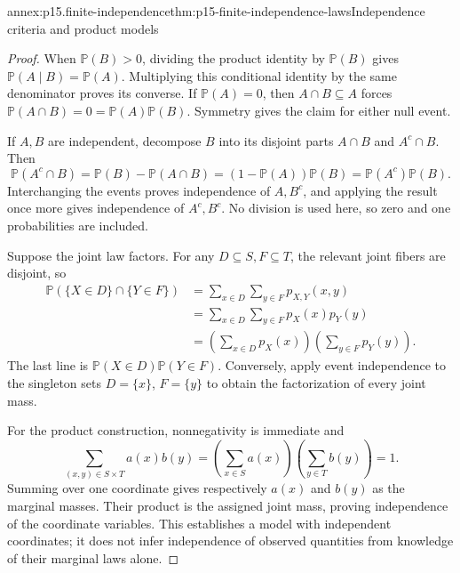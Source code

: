 \begin{annexitem}{annex:p15.finite-independence}{thm:p15-finite-independence-laws}{Independence criteria and product models}
\begin{proof}
When \(\mathbb P(B)>0\), dividing the product identity by
\(\mathbb P(B)\) gives \(\mathbb P(A\mid B)=\mathbb P(A)\).
Multiplying this conditional identity by the same denominator proves its
converse. If \(\mathbb P(A)=0\), then \(A\cap B\subseteq A\)
forces \(\mathbb P(A\cap B)=0=\mathbb P(A)\mathbb P(B)\).
Symmetry gives the claim for either null event.

If \(A,B\) are independent, decompose \(B\) into its disjoint parts
\(A\cap B\) and \(A^c\cap B\). Then
\[
 \mathbb P(A^c\cap B)
 =\mathbb P(B)-\mathbb P(A\cap B)
 =(1-\mathbb P(A))\mathbb P(B)
 =\mathbb P(A^c)\mathbb P(B).
\]
Interchanging the events proves independence of \(A,B^c\), and applying
the result once more gives independence of \(A^c,B^c\). No division is
used here, so zero and one probabilities are included.

Suppose the joint law factors. For any \(D\subseteq S,F\subseteq T\),
the relevant joint fibers are disjoint, so
\[
\begin{aligned}
 \mathbb P(\{X\in D\}\cap\{Y\in F\})
 &=\sum_{x\in D}\sum_{y\in F}p_{X,Y}(x,y)\\
 &=\sum_{x\in D}\sum_{y\in F}p_X(x)p_Y(y)\\
 &=\left(\sum_{x\in D}p_X(x)\right)
   \left(\sum_{y\in F}p_Y(y)\right).
\end{aligned}
\]
The last line is \(\mathbb P(X\in D)\mathbb P(Y\in F)\).
Conversely, apply event independence to the singleton sets
\(D=\{x\}\), \(F=\{y\}\) to obtain the factorization of every
joint mass.

For the product construction, nonnegativity is immediate and
\[
 \sum_{(x,y)\in S\times T}a(x)b(y)
 =\left(\sum_{x\in S}a(x)\right)
  \left(\sum_{y\in T}b(y)\right)=1.
\]
Summing over one coordinate gives respectively \(a(x)\) and \(b(y)\)
as the marginal masses. Their product is the assigned joint mass, proving
independence of the coordinate variables. This establishes a model with
independent coordinates; it does not infer independence of observed
quantities from knowledge of their marginal laws alone.
\end{proof}
\end{annexitem}


